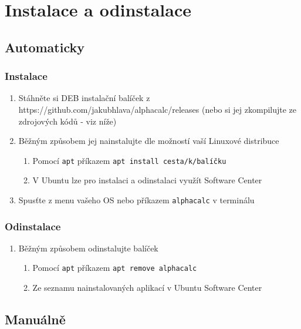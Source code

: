 \documentclass[a4paper, 12pt]{article}
\begin{document}
\tableofcontents
\newpage
\section{Instalace a odinstalace}
    \subsection{Automaticky}
        \subsubsection{Instalace}
            \begin{enumerate}
                \item Stáhněte si DEB instalační balíček z https://github.com/jakubhlava/alphacalc/releases (nebo si jej zkompilujte ze zdrojových kódů - viz níže)
                \item Běžným způsobem jej nainstalujte dle možností vaší Linuxové distribuce
                    \begin{enumerate}
                        \item Pomocí \texttt{apt} příkazem \texttt{apt install cesta/k/balíčku}
                        \item V Ubuntu lze pro instalaci a odinstalaci využít Software Center
                    \end{enumerate}
                \item Spusťte z menu vašeho OS nebo příkazem \texttt{alphacalc} v terminálu
            \end{enumerate}
        \subsubsection{Odinstalace}
            \begin{enumerate}
                \item Běžným způsobem odinstalujte balíček
                \begin{enumerate}
                    \item Pomocí \texttt{apt} příkazem \texttt{apt remove alphacalc}
                    \item Ze seznamu nainstalovaných aplikací v Ubuntu Software Center
                \end{enumerate}
            \end{enumerate}
    \subsection{Manuálně}
\end{document}

